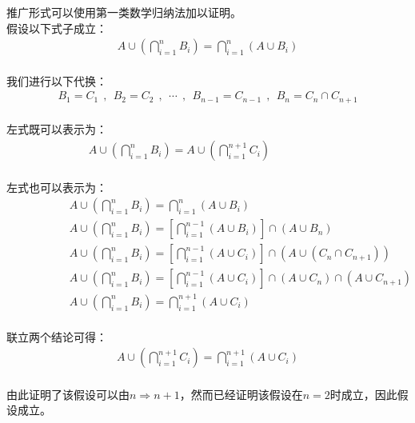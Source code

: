 \documentclass[UTF8]{ctexart}
\begin{document}
\newpage

    推广形式可以使用第一类数学归纳法加以证明。\\[3mm]
    假设以下式子成立：
    \setcounter{equation}{0}
    \begin{align}
        A\cup\left(\bigcap_{i=1}^n B_i\right)=\bigcap_{i=1}^n(A\cup B_i)
    \end{align}\\
    我们进行以下代换：
    \begin{align}
        B_1=C_1~~,~~B_2=C_2~~,~~\cdots~~,~~B_{n-1}=C_{n-1}~~,~~B_n=C_n\cap C_{n+1}
    \end{align}\\
    左式既可以表示为：
    \begin{align}
        A\cup\left(\bigcap_{i=1}^n B_i\right)=A\cup\left(\bigcap_{i=1}^{n+1} C_i\right)~~~~~~~~~~~~~~~~~~~~~~~
    \end{align}\\
    左式也可以表示为：
    \begin{align}
        &~~~~~~~~~~~~~~~~~~~~A\cup\left(\bigcap_{i=1}^n B_i\right)=\bigcap_{i=1}^n(A\cup B_i)\\[3mm]
        &~~~~~~~~~~~~~~~~~~~~A\cup\left(\bigcap_{i=1}^n B_i\right)=\left[\bigcap_{i=1}^{n-1}(A\cup B_i)\right]\cap(A\cup B_n)\\[3mm]
        &~~~~~~~~~~~~~~~~~~~~A\cup\left(\bigcap_{i=1}^n B_i\right)=\left[\bigcap_{i=1}^{n-1}(A\cup C_i)\right]\cap(A\cup (C_n\cap C_{n+1}))\\[3mm]
        &~~~~~~~~~~~~~~~~~~~~A\cup\left(\bigcap_{i=1}^n B_i\right)=\left[\bigcap_{i=1}^{n-1}(A\cup C_i)\right]\cap(A\cup C_n)\cap(A\cup C_{n+1})\\[3mm]
        &~~~~~~~~~~~~~~~~~~~~A\cup\left(\bigcap_{i=1}^n B_i\right)=\bigcap_{i=1}^{n+1}(A\cup C_i)
    \end{align}\\
    联立两个结论可得：
    \begin{align}
        A\cup\left(\bigcap_{i=1}^{n+1} C_i\right)=\bigcap_{i=1}^{n+1}(A\cup C_i)
    \end{align}\\
    由此证明了该假设可以由$n\Rightarrow n+1$，然而已经证明该假设在$n=2$时成立，因此假设成立。

\newpage
\end{document}
